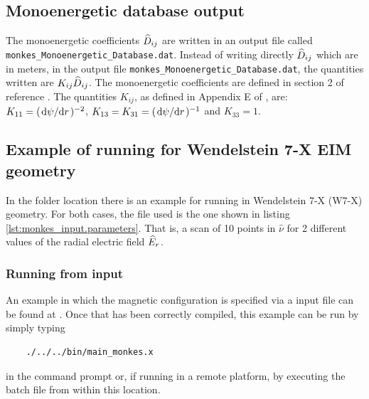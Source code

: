 



\subsection{Monoenergetic database output}

The monoenergetic coefficients $\widehat{D}_{ij}$ are written in an output file called \texttt{monkes\_Monoenergetic\_Database.dat}. Instead of writing directly $\widehat{D}_{ij}$ which are in meters, in the output file \texttt{monkes\_Monoenergetic\_Database.dat}, the quantities written are $K_{ij} \widehat{D}_{ij}$. The monoenergetic coefficients are defined in section 2 of reference \cite{Escoto_2024}. The quantities $K_{ij}$, as defined in Appendix E of \cite{Escoto_2024}, are: $K_{11}=(\dv*{\psi}{r})^{-2}$, $K_{13}=K_{31}=(\dv*{\psi}{r})^{-1}$ and $K_{33}=1$.


\begin{landscape}
\end{landscape}


\subsection{Example of running {\MONKES} for Wendelstein 7-X EIM geometry}

In the folder location \texttt{} there is an example for running {\MONKES} in Wendelstein 7-X (W7-X) geometry. For both cases, the \texttt{} file used is the one shown in listing \ref{lst:monkes_input.parameters}. That is, a scan of 10 points in $\hat{\nu}$ for 2 different values of the radial electric field $\widehat{E}_{r}$.


\subsubsection{Running from {\DKES} input}\label{sec:Running_example_dkes_input}
An example in which the magnetic configuration is specified via a {\DKES} input file can be found at \texttt{}. Once that {\MONKES} has been correctly compiled, this example can be run by simply typing
\begin{verbatim}
	./../../bin/main_monkes.x
\end{verbatim} 
in the command prompt or, if running in a remote platform, by executing the batch file from within this location.

